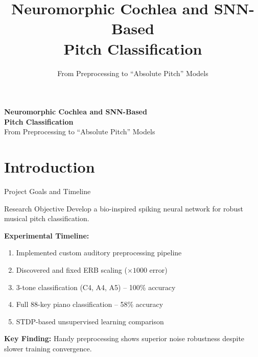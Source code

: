 \documentclass[aspectratio=169,20pt]{beamer}
\title[Neuromorphic Cochlea]{\textbf{Neuromorphic Cochlea and SNN-Based\\Pitch Classification}}
\subtitle{From Preprocessing to ``Absolute Pitch'' Models}
\begin{document}
{
\begin{frame} 
\vspace{1.5cm}
\begin{center}
    {\LARGE\textbf{Neuromorphic Cochlea and SNN-Based}}\\[0.3cm]
    {\LARGE\textbf{Pitch Classification}}\\[0.8cm]
    {\normalsize From Preprocessing to ``Absolute Pitch'' Models}\\[1.5cm]
\end{center}
\end{frame}
}
\setcounter{framenumber}{12}

\section{Introduction}

\begin{frame}{Project Goals and Timeline}
\begin{block}{Research Objective}
Develop a bio-inspired spiking neural network for robust musical pitch classification.
\end{block}

\vfill
\textbf{Experimental Timeline:}
\begin{enumerate}
    \item Implemented custom auditory preprocessing pipeline
    \item Discovered and fixed ERB scaling  ($\times 1000$ error)
    \item 3-tone classification (C4, A4, A5) -- 100\% accuracy
    \item Full 88-key piano classification -- 58\% accuracy
    \item STDP-based unsupervised learning comparison
\end{enumerate}

\vfill
\textbf{Key Finding:} Handy preprocessing shows superior noise robustness despite slower training convergence.
\end{frame}
\end{document}
